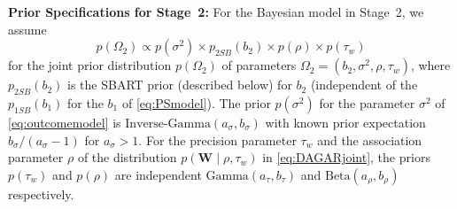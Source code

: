 \documentclass[aoas]{imsart}
\theoremstyle{plain}
\theoremstyle{definition}
\begin{document}
\textbf{Prior Specifications for Stage~2:}
For the Bayesian model in Stage~2, we assume 
\begin{equation}
    p(\Omega_2)\propto   p(\sigma^2) \times p_{2SB}(b_2)  \times p(\rho) \times p(\tau_w)
    \label{eq:jointprior}
\end{equation}
for the joint prior distribution $p(\Omega_2)$ of  parameters $\Omega_2=(b_2, \sigma^2,\rho,\tau_w)$, where $p_{2SB}(b_2)$ is the SBART prior (described below) for $b_2$ (independent of the $p_{1SB}(b_1)$  for the $b_1$ of  \eqref{eq:PSmodel}). The prior  $p(\sigma^2)$ for the parameter $\sigma^2$ of \eqref{eq:outcomemodel} is $\text{Inverse-Gamma}(a_\sigma, b_\sigma)$ with known prior expectation  $b_{\sigma}/(a_{\sigma}-1)$ for $a_{\sigma}>1$. For the precision parameter $\tau_w$ and the association parameter $\rho$ of the distribution $p(\mathbf{W} \mid \rho, \tau_w)$ in \eqref{eq:DAGARjoint}, the priors $p(\tau_w)$ and $p(\rho)$  are  independent $\text{Gamma}(a_\tau,b_\tau)$ and $\text{Beta}(a_\rho,b_\rho)$ respectively. 
\end{document}

